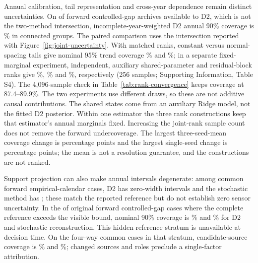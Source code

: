 \documentclass[draft,linenumbers]{agujournal2025}
\begin{document}
Annual calibration, tail representation and cross-year dependence remain distinct uncertainties. On \UCCommon{} of \UCAll{} forward controlled-gap archives available to D2, which is not the two-method intersection, incomplete-year-weighted D2 annual 90\% coverage is \UCAnnual\% in \UCGroups{} connected groups. The paired comparison uses the intersection reported with Figure~\ref{fig:joint-uncertainty}. With matched ranks, constant versus normal-spacing tails give nominal 95\% trend coverage \UCTailConstant\% and \UCTailNormal\%; in a separate fixed-marginal experiment, independent, auxiliary shared-parameter and residual-block ranks give \UCIndependent\%, \UCShared\% and \UCBlocks\%, respectively (256 samples; Supporting Information, Table S4). The 4,096-sample check in Table~\ref{tab:rank-convergence} keeps coverage at 87.4--89.9\%. The two experiments use different draws, so these are not additive causal contributions. The shared states come from an auxiliary Ridge model, not the fitted D2 posterior. Within one estimator the three rank constructions keep that estimator's annual marginals fixed. Increasing the joint-rank sample count does not remove the forward undercoverage. The largest three-seed-mean coverage change is \CCRankChangeMax{} percentage points and the largest single-seed change is \CCRankSeedChangeMax{} percentage points; the mean is not a resolution guarantee, and the constructions are not ranked.

Support projection can also make annual intervals degenerate: among \SPCalendarCommon{} common forward empirical-calendar cases, D2 has \SPCalendarDTwoZero{} zero-width intervals and the stochastic method has \SPCalendarClassicZero{}; these match the reported reference but do not establish zero sensor uncertainty. In the \PVCrossHidden{} of \PVCrossAll{} original forward controlled-gap cases where the complete reference exceeds the visible bound, nominal 90\% coverage is \PVCrossDTwoCoverage\% and \PVCrossClassicCoverage\% for D2 and stochastic reconstruction. This hidden-reference stratum is unavailable at decision time. On the \OpenAnnualCases{} four-way common cases in that stratum, candidate-source coverage is \OpenAnnualDTwoNew\% and \OpenAnnualClassicNew\%; changed sources and roles preclude a single-factor attribution.
\end{document}
